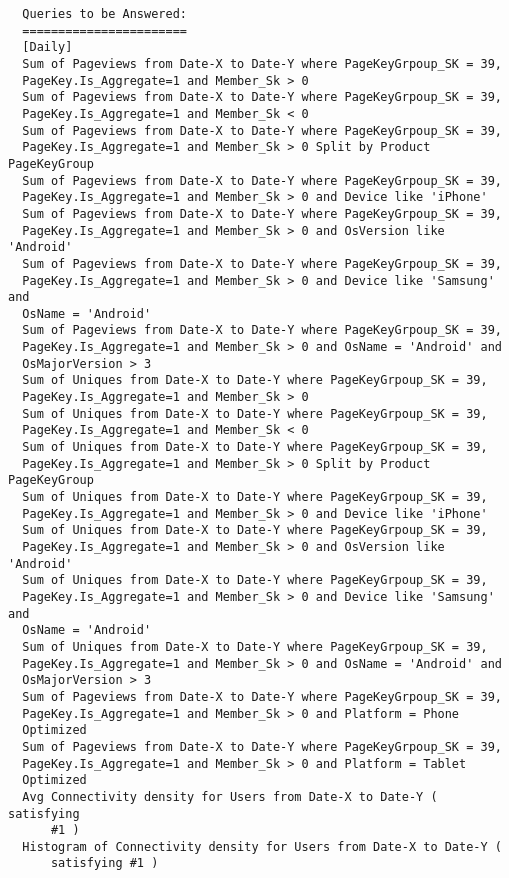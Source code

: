 \begin{verbatim}
  Queries to be Answered:
  =======================
  [Daily]
  Sum of Pageviews from Date-X to Date-Y where PageKeyGrpoup_SK = 39,
  PageKey.Is_Aggregate=1 and Member_Sk > 0
  Sum of Pageviews from Date-X to Date-Y where PageKeyGrpoup_SK = 39,
  PageKey.Is_Aggregate=1 and Member_Sk < 0
  Sum of Pageviews from Date-X to Date-Y where PageKeyGrpoup_SK = 39,
  PageKey.Is_Aggregate=1 and Member_Sk > 0 Split by Product PageKeyGroup
  Sum of Pageviews from Date-X to Date-Y where PageKeyGrpoup_SK = 39,
  PageKey.Is_Aggregate=1 and Member_Sk > 0 and Device like 'iPhone'
  Sum of Pageviews from Date-X to Date-Y where PageKeyGrpoup_SK = 39,
  PageKey.Is_Aggregate=1 and Member_Sk > 0 and OsVersion like 'Android'
  Sum of Pageviews from Date-X to Date-Y where PageKeyGrpoup_SK = 39,
  PageKey.Is_Aggregate=1 and Member_Sk > 0 and Device like 'Samsung' and
  OsName = 'Android'
  Sum of Pageviews from Date-X to Date-Y where PageKeyGrpoup_SK = 39,
  PageKey.Is_Aggregate=1 and Member_Sk > 0 and OsName = 'Android' and
  OsMajorVersion > 3
  Sum of Uniques from Date-X to Date-Y where PageKeyGrpoup_SK = 39,
  PageKey.Is_Aggregate=1 and Member_Sk > 0
  Sum of Uniques from Date-X to Date-Y where PageKeyGrpoup_SK = 39,
  PageKey.Is_Aggregate=1 and Member_Sk < 0
  Sum of Uniques from Date-X to Date-Y where PageKeyGrpoup_SK = 39,
  PageKey.Is_Aggregate=1 and Member_Sk > 0 Split by Product PageKeyGroup
  Sum of Uniques from Date-X to Date-Y where PageKeyGrpoup_SK = 39,
  PageKey.Is_Aggregate=1 and Member_Sk > 0 and Device like 'iPhone'
  Sum of Uniques from Date-X to Date-Y where PageKeyGrpoup_SK = 39,
  PageKey.Is_Aggregate=1 and Member_Sk > 0 and OsVersion like 'Android'
  Sum of Uniques from Date-X to Date-Y where PageKeyGrpoup_SK = 39,
  PageKey.Is_Aggregate=1 and Member_Sk > 0 and Device like 'Samsung' and
  OsName = 'Android'
  Sum of Uniques from Date-X to Date-Y where PageKeyGrpoup_SK = 39,
  PageKey.Is_Aggregate=1 and Member_Sk > 0 and OsName = 'Android' and
  OsMajorVersion > 3
  Sum of Pageviews from Date-X to Date-Y where PageKeyGrpoup_SK = 39,
  PageKey.Is_Aggregate=1 and Member_Sk > 0 and Platform = Phone
  Optimized
  Sum of Pageviews from Date-X to Date-Y where PageKeyGrpoup_SK = 39,
  PageKey.Is_Aggregate=1 and Member_Sk > 0 and Platform = Tablet
  Optimized
  Avg Connectivity density for Users from Date-X to Date-Y ( satisfying
      #1 )
  Histogram of Connectivity density for Users from Date-X to Date-Y (
      satisfying #1 )


\end{verbatim}
